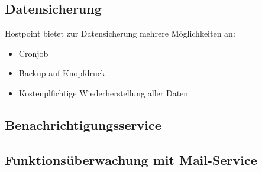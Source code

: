  


\subsection{Datensicherung}
Hostpoint bietet zur Datensicherung mehrere Möglichkeiten an:
\begin{itemize}
\item Cronjob
\item Backup auf Knopfdruck
\item Kostenplfichtige Wiederherstellung aller Daten
\end{itemize}








\subsection{Benachrichtigungsservice}

\subsection{Funktionsüberwachung mit Mail-Service}

